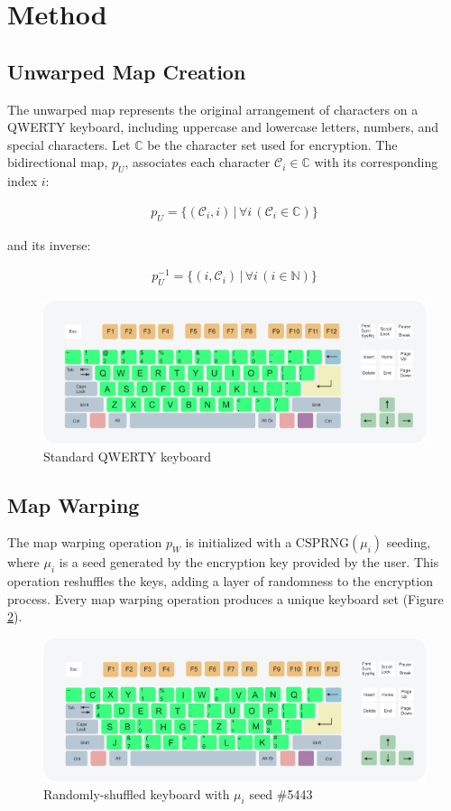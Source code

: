 \documentclass{article}
\begin{document}
\section{Method}

\subsection{Unwarped Map Creation}
The unwarped map represents the original arrangement of characters on a QWERTY keyboard, including uppercase and lowercase letters, numbers, and special characters. Let \( \mathbb{C} \) be the character set used for encryption. The bidirectional map, \( p_U \), associates each character \( \mathcal{C}_i \in \mathbb{C} \)  with its corresponding index \( i \):

\begin{align}
    p_U = \{ (\mathcal{C}_i, i) \, | \, \forall i \, (\mathcal{C}_i \in \mathbb{C}) \}
\end{align}

and its inverse:

\begin{align}
    p_U^{-1} = \{ (i, \mathcal{C}_i) \, | \, \forall i \, (i \in \mathbb{N}) \}
\end{align}

\begin{figure}[h]
  \centering
  \includegraphics[width=0.7\linewidth]{img/qwerty.png}
  \caption{Standard QWERTY keyboard}
  \label{fig:keyboard}
\end{figure}

\subsection{Map Warping}
The map warping operation \( p_W \) is initialized with a \( \text{CSPRNG}(\mu_i) \) seeding, where \( \mu_i \) is a seed generated by the encryption key provided by the user. This operation reshuffles the keys, adding a layer of randomness to the encryption process. Every map warping operation produces a unique keyboard set (Figure \ref{fig:hash}).

\begin{figure}[h]
  \centering
  \includegraphics[width=0.7\linewidth]{img/qwerty_shuffled.png}
  \caption{Randomly-shuffled keyboard with $\mu_i$ seed \#5443}
  \label{fig:hash}
\end{figure}
\end{document}
